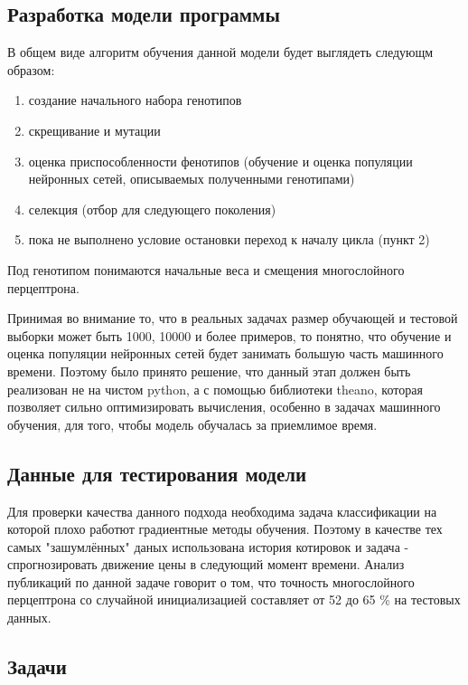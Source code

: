 \documentclass[a4paper,12pt]{article}
\begin{document}
\subsection{Разработка модели программы}
В общем виде алгоритм обучения данной модели будет выглядеть следующм образом:
\begin{enumerate}
\item создание начального набора генотипов
\item скрещивание и мутации
\item оценка приспособленности фенотипов (обучение и оценка популяции нейронных сетей, описываемых полученными генотипами)
\item селекция (отбор для следующего поколения)
\item пока не выполнено условие остановки переход к началу цикла (пункт 2)
\end{enumerate}
Под генотипом понимаются начальные веса и смещения многослойного перцептрона.

\par Принимая во внимание то, что в реальных задачах размер обучающей и тестовой выборки может быть 1000, 10000 и более примеров, то понятно, что обучение и оценка популяции нейронных сетей будет занимать большую часть машинного времени. Поэтому было принято решение, что данный этап должен быть реализован не на чистом python, а с помощью библиотеки theano, которая позволяет сильно оптимизировать вычисления, особенно в задачах машинного обучения, для того, чтобы модель обучалась за приемлимое время.

\subsection{Данные для тестирования модели}

\par Для проверки качества данного подхода необходима задача классификации на которой плохо работют градиентные методы обучения. Поэтому в качестве тех самых "зашумлённых" даных использована история котировок и задача - спрогнозировать движение цены в следующий момент времени. Анализ публикаций по данной задаче говорит о том, что точность многослойного перцептрона со случайной инициализацией составляет от 52 до 65 \% на тестовых данных.

\subsection{Задачи}
\end{document}
